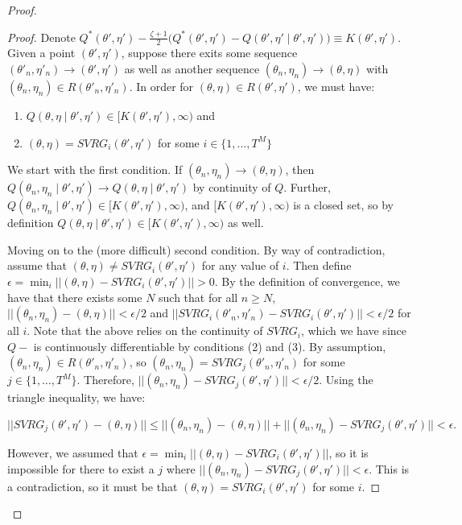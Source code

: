 \begin{proof}
\begin{proof}
     Denote $Q^*(\theta', \eta') - \frac{\zeta + 1}{2} \Big( Q^*(\theta', \eta') - Q(\theta', \eta' \mid \theta', \eta') \Big) \equiv K(\theta',\eta')$. Given a point $(\theta',\eta')$, suppose there exits some sequence $(\theta'_{n},\eta'_{n}) \to (\theta',\eta')$ as well as another sequence $(\theta_{n},\eta_{n}) \to (\theta,\eta)$ with $(\theta_{n},\eta_{n}) \in R(\theta'_{n},\eta'_{n})$. In order for $(\theta,\eta) \in R(\theta',\eta')$, we must have:
    \begin{enumerate}
        \item $Q(\theta, \eta \mid \theta', \eta') \in [K(\theta',\eta'),\infty)$ and
        \item $(\theta,\eta) = SVRG_i(\theta',\eta')$ for some $i \in \{1,\ldots,T^M\}$
    \end{enumerate}
    We start with the first condition. If $(\theta_{n},\eta_{n}) \to (\theta,\eta)$, then $Q(\theta_{n},\eta_{n} \mid \theta',\eta') \to Q(\theta,\eta \mid \theta',\eta')$ by continuity of $Q$. Further, $Q(\theta_{n},\eta_{n} \mid \theta',\eta') \in [K(\theta',\eta'),\infty)$, and $[K(\theta',\eta'),\infty)$ is a closed set, so by definition $Q(\theta,\eta \mid \theta',\eta') \in [K(\theta',\eta'),\infty)$ as well.
    
    Moving on to the (more difficult) second condition. By way of contradiction, assume that $(\theta,\eta) \neq SVRG_i(\theta',\eta')$ for any value of $i$. Then define $\epsilon = \min_i ||(\theta,\eta) - SVRG_i(\theta',\eta')|| > 0$. By the definition of convergence, we have that there exists some $N$ such that for all $n \geq N$, $||(\theta_{n},\eta_{n}) - (\theta,\eta)|| < \epsilon/2$ and $||SVRG_i(\theta'_{n},\eta'_{n}) - SVRG_i(\theta',\eta')|| < \epsilon/2$ for all $i$. Note that the above relies on the continuity of $SVRG_i$, which we have since $Q-$ is continuously differentiable by conditions (2) and (3). By assumption, $(\theta_{n},\eta_{n}) \in R(\theta'_{n},\eta'_{n})$, so $(\theta_{n},\eta_{n}) = SVRG_j(\theta'_{n},\eta'_{n})$ for some $j \in \{1,\ldots,T^M\}$. Therefore, $||(\theta_{n},\eta_{n}) - SVRG_j(\theta',\eta')|| < \epsilon/2$. Using the triangle inequality, we have:
    
    $$||SVRG_j(\theta',\eta') - (\theta,\eta)|| \leq ||(\theta_{n},\eta_{n}) - (\theta,\eta)|| + ||(\theta_{n},\eta_{n}) - SVRG_j(\theta',\eta')|| < \epsilon.$$
    
    However, we assumed that $\epsilon = \min_i ||(\theta,\eta) - SVRG_i(\theta',\eta')||$, so it is impossible for there to exist a $j$ where $||(\theta_{n},\eta_{n}) - SVRG_j(\theta',\eta')|| < \epsilon$. This is a contradiction, so it must be that $(\theta,\eta) = SVRG_i(\theta',\eta')$ for some $i$.
    

\end{proof}
\end{proof}
